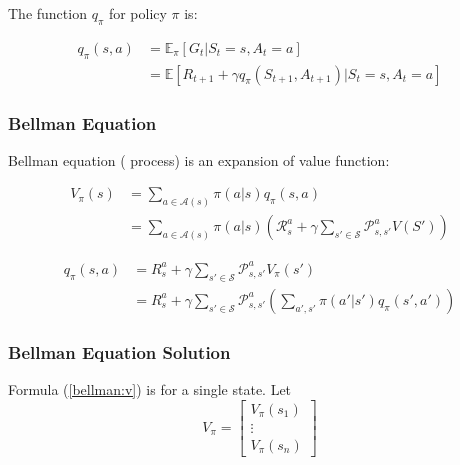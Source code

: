 The  function $q_\pi$ for policy $\pi$ is:

\begin{equation}
	\begin{aligned}
		q_{\pi}(s,a) &= \mathbb{E}_{\pi}[G_t|S_t=s,A_t=a] \\
					&= \mathbb{E}[R_{t+1} + \gamma q_{\pi}(S_{t+1}, A_{t+1})| S_t = s, A_t = a]
	\end{aligned}
\end{equation}

\subsubsection{Bellman Equation}


Bellman equation ( process) is an expansion of value function:

\begin{equation}\label{bellman:v}
	\begin{aligned}
		V_{\pi}(s) &= \sum_{a \in \mathcal{A}(s)} \pi(a|s) q_{\pi}(s,a) \\
		&= \sum_{a \in \mathcal{A}(s)} \pi(a|s) \left( \mathcal{R}_s^a + \gamma \sum_{s' \in \mathcal{S}} \mathcal{P}_{s,s'}^a V(S') \right)
	\end{aligned}
\end{equation}

\begin{equation}
	\begin{aligned}
		q_{\pi}(s,a) &= R_s^a + \gamma \sum_{s' \in \mathcal{S}} \mathcal{P}_{s,s'}^a V_{\pi}(s') \\
		&= R_s^a + \gamma \sum_{s' \in \mathcal{S}} \mathcal{P}_{s,s'}^a \left( \sum_{a', s'} \pi(a'|s') q_{\pi}(s',a') \right )
	\end{aligned}
\end{equation}



\subsubsection{Bellman Equation Solution}

Formula (\ref{bellman:v}) is for a single state. Let 
\begin{equation}
	V_{\pi} = \left [\begin{matrix}
 	V_{\pi}(s_1) \\
 	\vdots \\
 	V_{\pi}(s_n)
 \end{matrix} \right ]
\end{equation}

